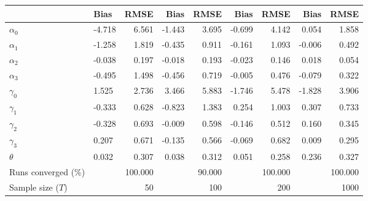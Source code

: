 
\begin{tabular}[t]{llrrrrrrr}
\toprule
  & Bias & RMSE & Bias & RMSE & Bias & RMSE & Bias & RMSE\\
\midrule
$\alpha_{0}$ & -4.718 & 6.561 & -1.443 & 3.695 & -0.699 & 4.142 & 0.054 & 1.858\\
$\alpha_{1}$ & -1.258 & 1.819 & -0.435 & 0.911 & -0.161 & 1.093 & -0.006 & 0.492\\
$\alpha_{2}$ & -0.038 & 0.197 & -0.018 & 0.193 & -0.023 & 0.146 & 0.018 & 0.054\\
$\alpha_{3}$ & -0.495 & 1.498 & -0.456 & 0.719 & -0.005 & 0.476 & -0.079 & 0.322\\
$\gamma_{0}$ & 1.525 & 2.736 & 3.466 & 5.883 & -1.746 & 5.478 & -1.828 & 3.906\\
$\gamma_{1}$ & -0.333 & 0.628 & -0.823 & 1.383 & 0.254 & 1.003 & 0.307 & 0.733\\
$\gamma_{2}$ & -0.328 & 0.693 & -0.009 & 0.598 & -0.146 & 0.512 & 0.160 & 0.345\\
$\gamma_{3}$ & 0.207 & 0.671 & -0.135 & 0.566 & -0.069 & 0.682 & 0.009 & 0.295\\
$\theta$ & 0.032 & 0.307 & 0.038 & 0.312 & 0.051 & 0.258 & 0.236 & 0.327\\
Runs converged (\%) &  & 100.000 &  & 90.000 &  & 100.000 &  & 100.000\\
Sample size ($T$) &  & 50 &  & 100 &  & 200 &  & 1000\\
\bottomrule
\end{tabular}
